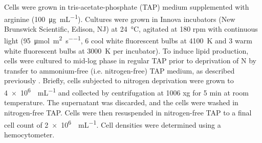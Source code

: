 \documentclass[aps,pra,reprint,superscriptaddress]{revtex4-1}
\begin{document}
Cells were grown in tris-acetate-phosphate (TAP) medium supplemented with arginine (\SI{100}{\micro\gram\per\milli\liter}). Cultures were grown in Innova incubators (New Brunswick Scientific, Edison, NJ) at \SI{24}{\degreeCelsius}, agitated at 180 rpm with continuous light (\SI{95}{\micro\mole\per\square\meter\per\second}, 6 cool white fluorescent bulbs at \SI{4100}{\kelvin} and 3 warm white fluorescent bulbs at \SI{3000}{\kelvin} per incubator). To induce lipid production, cells were cultured to mid-log phase in regular TAP prior to deprivation of N by transfer to ammonium-free (i.e. nitrogen-free) TAP medium, as described previously \cite{blaby2013systems}. Briefly, cells subjected to nitrogen deprivation were grown to \SI{4e6}{\cells\per\milli\liter} and collected by centrifugation at 1006 xg for 5 min at room temperature. The supernatant was discarded, and the cells were washed in nitrogen-free TAP. Cells were then resuspended in nitrogen-free TAP to a final cell count of \SI{2e6}{\cells\per\milli\liter}. Cell densities were determined using a hemocytometer.





%
\end{document}
